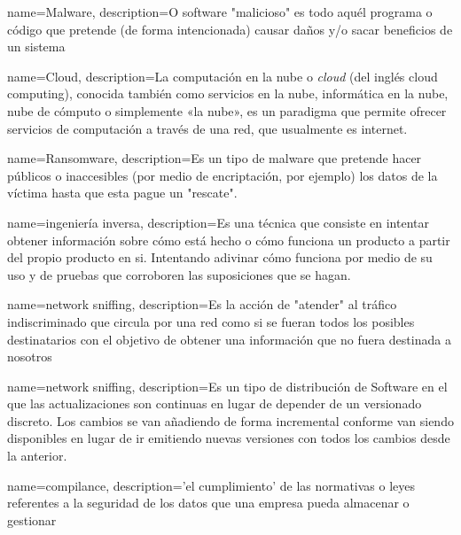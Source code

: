 {
    name=Malware,
    description={O software "malicioso" es todo aquél programa o código que pretende (de forma intencionada) causar daños y/o sacar beneficios de un sistema}
}

{
    name=Cloud,
    description={La computación en la nube o \textit{cloud} (del inglés cloud computing), conocida también como servicios en la nube, informática en la nube, nube de cómputo o simplemente «la nube», es un paradigma que permite ofrecer servicios de computación a través de una red, que usualmente es internet.}
}

{
    name=Ransomware,
    description={Es un tipo de malware que pretende hacer públicos o inaccesibles (por medio de encriptación, por ejemplo) los datos de la víctima hasta que esta pague un "rescate".}
}


{
    name={ingeniería inversa},
    description={Es una técnica que consiste en intentar obtener información sobre cómo está hecho o cómo funciona un producto a partir del propio producto en si. Intentando adivinar cómo funciona por medio de su uso y de pruebas que corroboren las suposiciones que se hagan.}
}


{
    name=network sniffing,
    description={Es la acción de "atender" al tráfico indiscriminado que circula por una red como si se fueran todos los posibles destinatarios con el objetivo de obtener una información que no fuera destinada a nosotros}
}

{
    name=network sniffing,
    description={Es un tipo de distribución de Software en el que las actualizaciones son continuas en lugar de depender de un versionado discreto. Los cambios se van añadiendo de forma incremental conforme van siendo disponibles en lugar de ir emitiendo nuevas versiones con todos los cambios desde la anterior.}
}

{
    name=compilance,
    description={'el cumplimiento' de las normativas o leyes referentes a la seguridad de los datos que una empresa pueda almacenar o gestionar}
}

